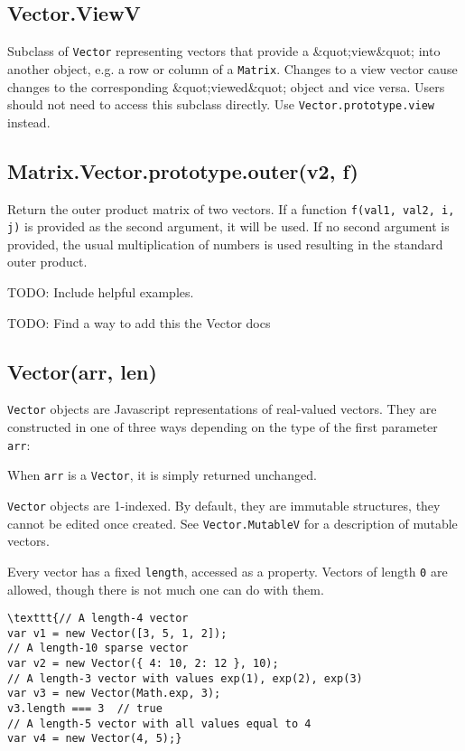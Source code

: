 \documentclass{article}
\begin{document}
    \subsection*{Vector.ViewV}
    Subclass of \texttt{Vector} representing vectors that provide a \&quot;view\&quot; into
another object, e.g. a row or column of a \texttt{Matrix}. Changes to a view
vector cause changes to the corresponding \&quot;viewed\&quot; object and vice versa.
Users should not need to access this subclass directly.
Use \texttt{Vector.prototype.view} instead.


    \subsection*{Matrix.Vector.prototype.outer(v2, f)}
    Return the outer product matrix of two vectors. If a function
\texttt{f(val1, val2, i, j)} is provided as the second argument, it will be used.
If no second argument is provided, the usual multiplication of numbers is
used resulting in the standard outer product.


TODO: Include helpful examples.


TODO: Find a way to add this the Vector docs


    \subsection*{Vector(arr, len)}
    \texttt{Vector} objects are Javascript representations of real-valued vectors.
They are constructed in one of three ways depending on the type of the first parameter \texttt{arr}:



When \texttt{arr} is a \texttt{Vector}, it is simply returned unchanged.


\texttt{Vector} objects are 1-indexed. By default, they are immutable structures, they cannot be edited
once created. See \texttt{Vector.MutableV} for a description of mutable vectors.


Every vector has a fixed \texttt{length}, accessed as a property.
Vectors of length \texttt{0} are allowed, though there is not much one can do with them.


\begin{lstlisting}
\texttt{// A length-4 vector
var v1 = new Vector([3, 5, 1, 2]);
// A length-10 sparse vector
var v2 = new Vector({ 4: 10, 2: 12 }, 10);
// A length-3 vector with values exp(1), exp(2), exp(3)
var v3 = new Vector(Math.exp, 3);
v3.length === 3  // true
// A length-5 vector with all values equal to 4
var v4 = new Vector(4, 5);}\end{lstlisting}
\end{document}
